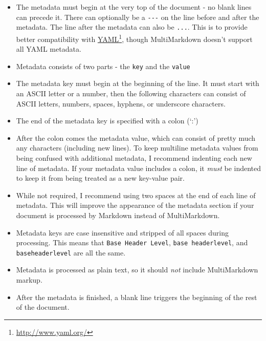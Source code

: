 \begin{itemize}
\item The metadata must begin at the very top of the document - no blank lines can precede it. There can optionally be a \texttt{-{}-{}-} on the line before and after the metadata. The line after the metadata can also be \texttt{...}. This is to provide better compatibility with \href{http://www.yaml.org/}{YAML}\footnote{\href{http://www.yaml.org/}{http:\slash{}\slash{}www.yaml.org\slash{}}}, though MultiMarkdown doesn't support all YAML metadata.

\item Metadata consists of two parts - the \texttt{key} and the \texttt{value}

\item The metadata key must begin at the beginning of the line. It must start with an ASCII letter or a number, then the following characters can consist of ASCII letters, numbers, spaces, hyphens, or underscore characters.

\item The end of the metadata key is specified with a colon (`:')

\item After the colon comes the metadata value, which can consist of pretty much any characters (including new lines). To keep multiline metadata values from being confused with additional metadata, I recommend indenting each new line of metadata. If your metadata value includes a colon, it \emph{must} be indented to keep it from being treated as a new key-value pair.

\item While not required, I recommend using two spaces at the end of each line of metadata. This will improve the appearance of the metadata section if your document is processed by Markdown instead of MultiMarkdown.

\item Metadata keys are case insensitive and stripped of all spaces during processing. This means that \texttt{Base Header Level}, \texttt{base headerlevel}, and \texttt{baseheaderlevel} are all the same.

\item Metadata is processed as plain text, so it should \emph{not} include MultiMarkdown markup.

\item After the metadata is finished, a blank line triggers the beginning of the rest of the document.

\end{itemize}

